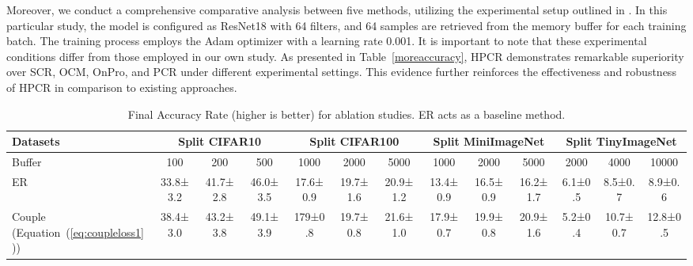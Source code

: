 Moreover, we conduct a comprehensive comparative analysis between five methods, utilizing the experimental setup outlined in \cite{guo2022online}. In this particular study, the model is configured as ResNet18 with 64 filters, and 64 samples are retrieved from the memory buffer for each training batch. The training process employs the Adam optimizer with a learning rate 0.001. It is important to note that these experimental conditions differ from those employed in our own study. As presented in Table~\ref{moreaccuracy}, HPCR demonstrates remarkable superiority over SCR, OCM, OnPro, and PCR under different experimental settings. This evidence further reinforces the effectiveness and robustness of HPCR in comparison to existing approaches.

\begin{table}[t]\small
\renewcommand\tabcolsep{2pt}
\centering
\caption{Final Accuracy Rate (higher is better) for ablation studies. ER acts as a baseline method.}
\vspace{-1ex}
\label{ablation}
\begin{tabular}{l|ccc|ccc|ccc|ccc}
\hline
Datasets & \multicolumn{3}{c|}{Split CIFAR10} & \multicolumn{3}{c|}{Split CIFAR100}& \multicolumn{3}{c|}{Split MiniImageNet}& \multicolumn{3}{c}{Split TinyImageNet}\\ \hline
Buffer & \multicolumn{1}{c|}{100} & \multicolumn{1}{c|}{200} & \multicolumn{1}{c|}{500} & \multicolumn{1}{c|}{1000} & \multicolumn{1}{c|}{2000} & \multicolumn{1}{c|}{5000}     & \multicolumn{1}{c|}{1000} & \multicolumn{1}{c|}{2000} & \multicolumn{1}{c|}{5000} & \multicolumn{1}{c|}{2000} & \multicolumn{1}{c|}{4000} & 10000     \\ \hline
ER & 33.8\scriptsize±3.2& 41.7\scriptsize±2.8                 & 46.0\scriptsize±3.5                 & 17.6\scriptsize±0.9                  & 19.7\scriptsize±1.6                  & 20.9\scriptsize±1.2 & 13.4\scriptsize±0.9                   & 16.5\scriptsize±0.9                  & 16.2\scriptsize±1.7                  & 6.1\scriptsize±0.5                  & 8.5\scriptsize±0.7                  & 8.9\scriptsize±0.6\\
Couple (Equation~(\ref{eq:coupleloss1})) & 38.4\scriptsize±3.0& 43.2\scriptsize±3.8                 & 49.1\scriptsize±3.9                 & 179\scriptsize±0.8                  & 19.7\scriptsize±0.8                  & 21.6\scriptsize±1.0 & 17.9\scriptsize±0.7                   & 19.9\scriptsize±0.8                  & 20.9\scriptsize±1.6                  & 5.2\scriptsize±0.4                  & 10.7\scriptsize±0.7                  & 12.8\scriptsize±0.5\\

\end{tabular}
\end{table}
